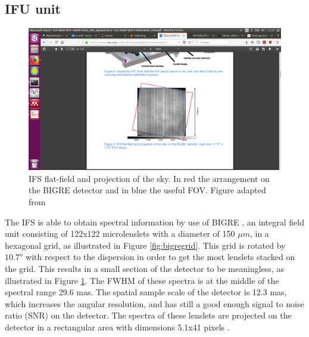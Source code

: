 \documentclass[twoside,single,12pt]{lion-msc}
\begin{document}
\subsection{IFU unit}
\begin{figure}
\centering 
\vspace{-9mm}
\includegraphics[trim={19cm 5.5cm 14cm 10cm},clip,width = 0.9\linewidth]{biggre}
\caption{IFS flat-field and projection of the sky. In red the arrangement on the BIGRE detector and in blue the useful FOV. Figure adapted from \citep{Observatory2007}}
\label{fig:bigre}
\vspace{-7mm}
\end{figure}

The IFS is able to obtain spectral information by use of BIGRE \cite{Antichi2009}, an integral field unit consisting of 122x122 microlenslets with a diameter of 150 $\mu m$, in a hexagonal grid, as illustrated in Figure \ref{fig:bigregrid}. This grid is rotated by $10.7^o$ with respect to the dispersion in order to get the most lenslets stacked on the grid. This results in a small section of the detector to be meaningless, as illustrated in Figure \ref{fig:bigre}. The FWHM of these spectra is at the middle of the spectral range 29.6 mas. The spatial sample scale of the detector is 12.3 mas, which increases the angular resolution, and has still a good enough signal to noise ratio (SNR) on the detector. The spectra of these lenslets are projected on the detector in a rectangular area with dimensions 5.1x41 pixels \citep{Claudi2006}.
\end{document}
